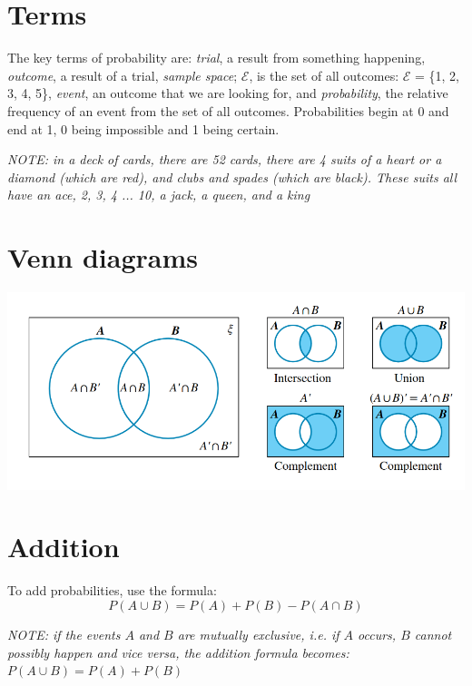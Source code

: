 \documentclass{book}
\begin{document}
\section{Terms}
The key terms of probability are: \emph{trial}, a result from something happening, \emph{outcome}, a result of a trial, \emph{sample space}; $\mathcal{E}$, is the set of all outcomes: $\mathcal{E}$ = \{1, 2, 3, 4, 5\}, \emph{event}, an outcome that we are looking for, and \emph{probability}, the relative frequency of an event from the set of all outcomes.  Probabilities begin at 0 and end at 1, 0 being impossible and 1 being certain.

\begin{center}
	\emph{NOTE: in a deck of cards, there are 52 cards, there are 4 suits of a heart or a diamond (which are red), and clubs and spades (which are black).  These suits all have an ace, 2, 3, 4 ... 10, a jack, a queen, and a king}
\end{center}

\section{Venn diagrams}
\begin{center}
	\includegraphics[scale=0.5]{venn diagrams}
\end{center}

\section{Addition}
To add probabilities, use the formula:
\[
	P(A \cup B) = P(A) + P(B) - P(A \cap B)
\]

\begin{center}
	\emph{NOTE: if the events $A$ and $B$ are mutually exclusive, i.e. if $A$ occurs, $B$ cannot possibly happen and vice versa, the addition formula becomes: $P(A \cup B) = P(A) + P(B)$}
\end{center}
\end{document}
